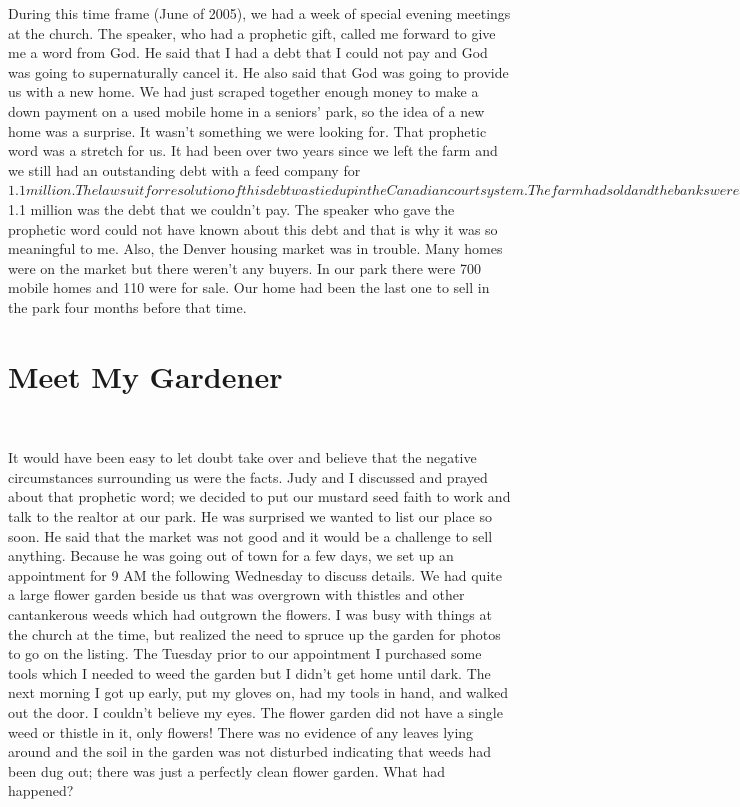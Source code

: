 \documentclass[oneside]{book}
\begin{document}
During this time frame (June of 2005), we had a week of special evening meetings at the church. The speaker, who had a prophetic gift, called me forward to give me a word from God. He said that I had a debt that I could not pay and God was going to supernaturally cancel it. He also said that God was going to provide us with a new home. We had just scraped together enough money to make a down payment on a used mobile home in a seniors’ park, so the idea of a new home was a surprise. It wasn’t something we were looking for. That prophetic word was a stretch for us. It had been over two years since we left the farm and we still had an outstanding debt with a feed company for $1.1 million. The lawsuit for resolution of this debt was tied up in the Canadian court system. The farm had sold and the banks were completely paid off, so the $1.1 million was the debt that we couldn’t pay. The speaker who gave the prophetic word could not have known about this debt and that is why it was so meaningful to me. Also, the Denver housing market was in trouble. Many homes were on the market but there weren’t any buyers. In our park there were 700 mobile homes and 110 were for sale. Our home had been the last one to sell in the park four months before that time.


\section{Meet My Gardener}
\

It would have been easy to let doubt take over and believe that the negative circumstances   surrounding us were the facts. Judy and I discussed and prayed about that prophetic word; we decided to put our mustard seed faith to work and talk to the realtor at our park. He was surprised we wanted to list our place so soon. He said that the market was not good and it would be a challenge to sell anything. Because he was going out of town for a few days, we set up an appointment for 9 AM the following Wednesday to discuss details. We had quite a large flower garden beside us that was overgrown with thistles and other cantankerous weeds which had outgrown the flowers. I was busy with things at the church at the time, but realized the need to spruce up the garden for photos to go on the listing. The Tuesday prior to our appointment I purchased some tools which I needed to weed the garden but I didn’t get home until dark. The next morning I got up early, put my gloves on, had my tools in hand, and walked out the door. I couldn’t believe my eyes. The flower garden did not have a single weed or thistle in it, only flowers! There was no evidence of any leaves lying around and the soil in the garden was not disturbed indicating that weeds had been dug out; there was just a perfectly clean flower garden. What had happened?
\end{document}
